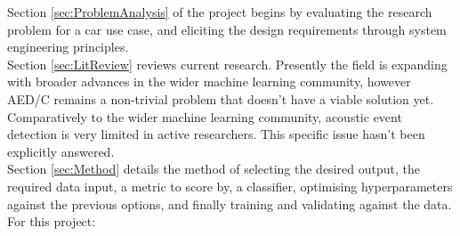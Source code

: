 \documentclass{UoNMCHA}
\newcommand{\sref}[1] {Section \ref{#1}}
\numberwithin{equation}{section}
\begin{document}
\sref{sec:ProblemAnalysis} of the project begins by evaluating the research problem for a car use case, and eliciting the design requirements through system engineering principles. \\

\sref{sec:LitReview} reviews current research. Presently the field is expanding with broader advances in the wider machine learning community, however AED/C remains a non-trivial problem that doesn't have a viable solution yet. Comparatively to the wider machine learning community, acoustic event detection is very limited in active researchers. This specific issue hasn't been explicitly answered. \\

\sref{sec:Method} details the method of selecting the desired output, the required data input, a metric to score by, a classifier, optimising hyperparameters against the previous options, and finally training and validating against the data. For this project:
\end{document}

